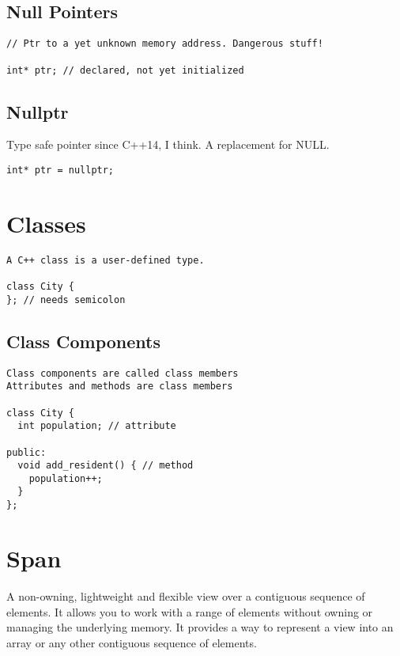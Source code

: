 \subsection{Null Pointers}

\begin{verbatim}
// Ptr to a yet unknown memory address. Dangerous stuff!

int* ptr; // declared, not yet initialized
\end{verbatim}

\subsection{Nullptr}

Type safe pointer since C++14, I think. A replacement for NULL.

\begin{verbatim}
int* ptr = nullptr;
\end{verbatim}

\section{Classes}

\begin{verbatim}
A C++ class is a user-defined type.

class City {
}; // needs semicolon
\end{verbatim}

\subsection{Class Components}

\begin{verbatim}
Class components are called class members
Attributes and methods are class members

class City {
  int population; // attribute
 
public:
  void add_resident() { // method
    population++;
  }
};
\end{verbatim}


\section{Span}

A non-owning, lightweight and flexible view over a contiguous sequence of elements. It allows you to work with a range of elements without owning or managing the underlying memory.
It provides a way to represent a view into an array or any other contiguous sequence of elements. 

